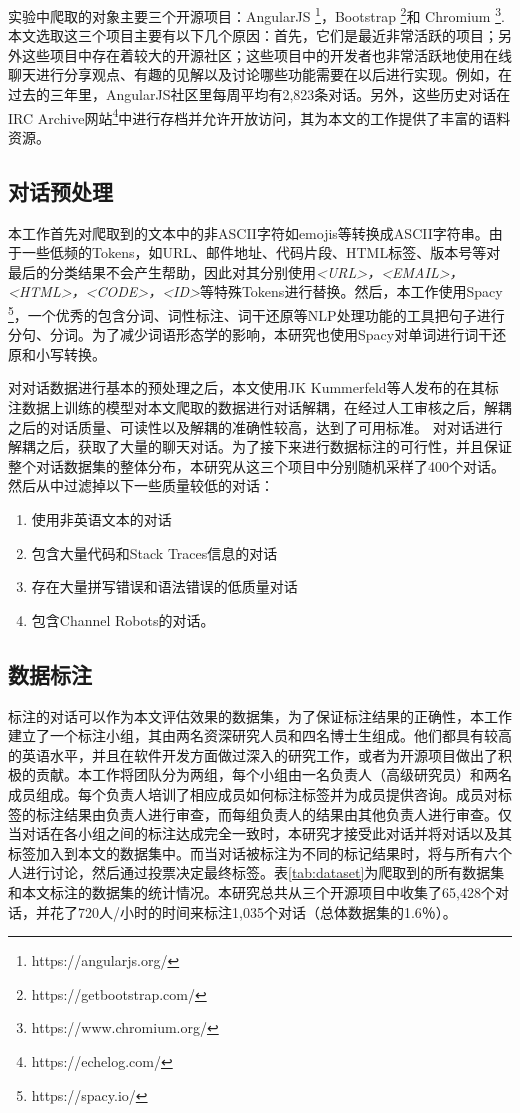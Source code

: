 实验中爬取的对象主要三个开源项目：AngularJS \footnote{https://angularjs.org/}，Bootstrap  \footnote{https://getbootstrap.com/}和 Chromium \footnote{https://www.chromium.org/}. 本文选取这三个项目主要有以下几个原因：首先，它们是最近非常活跃的项目；另外这些项目中存在着较大的开源社区；这些项目中的开发者也非常活跃地使用在线聊天进行分享观点、有趣的见解以及讨论哪些功能需要在以后进行实现。例如，在过去的三年里，AngularJS社区里每周平均有2,823条对话。另外，这些历史对话在IRC Archive网站\footnote{https://echelog.com/}中进行存档并允许开放访问，其为本文的工作提供了丰富的语料资源。

\subsection{对话预处理}
本工作首先对爬取到的文本中的非ASCII字符如emojis等转换成ASCII字符串。由于一些低频的Tokens，如URL、邮件地址、代码片段、HTML标签、版本号等对最后的分类结果不会产生帮助，因此对其分别使用\textit{<URL>，<EMAIL>，<HTML>，<CODE>，<ID>}等特殊Tokens进行替换。然后，本工作使用Spacy \footnote{https://spacy.io/}，一个优秀的包含分词、词性标注、词干还原等NLP处理功能的工具把句子进行分句、分词。为了减少词语形态学的影响，本研究也使用Spacy对单词进行词干还原和小写转换。

对对话数据进行基本的预处理之后，本文使用JK Kummerfeld等人\cite{kummerfeld2018large}发布的在其标注数据上训练的模型对本文爬取的数据进行对话解耦，在经过人工审核之后，解耦之后的对话质量、可读性以及解耦的准确性较高，达到了可用标准。
对对话进行解耦之后，获取了大量的聊天对话。为了接下来进行数据标注的可行性，并且保证整个对话数据集的整体分布，本研究从这三个项目中分别随机采样了400个对话。然后从中过滤掉以下一些质量较低的对话：
\begin{enumerate}
    \item 使用非英语文本的对话
    \item 包含大量代码和Stack Traces信息的对话
    \item 存在大量拼写错误和语法错误的低质量对话
    \item 包含Channel Robots的对话。
\end{enumerate}

\subsection{数据标注}
标注的对话可以作为本文评估效果的数据集，为了保证标注结果的正确性，本工作建立了一个标注小组，其由两名资深研究人员和四名博士生组成。他们都具有较高的英语水平，并且在软件开发方面做过深入的研究工作，或者为开源项目做出了积极的贡献。本工作将团队分为两组，每个小组由一名负责人（高级研究员）和两名成员组成。每个负责人培训了相应成员如何标注标签并为成员提供咨询。成员对标签的标注结果由负责人进行审查，而每组负责人的结果由其他负责人进行审查。仅当对话在各小组之间的标注达成完全一致时，本研究才接受此对话并将对话以及其标签加入到本文的数据集中。而当对话被标注为不同的标记结果时，将与所有六个人进行讨论，然后通过投票决定最终标签。表\ref{tab:dataset}为爬取到的所有数据集和本文标注的数据集的统计情况。本研究总共从三个开源项目中收集了65,428个对话，并花了720人/小时的时间来标注1,035个对话（总体数据集的1.6％）。

